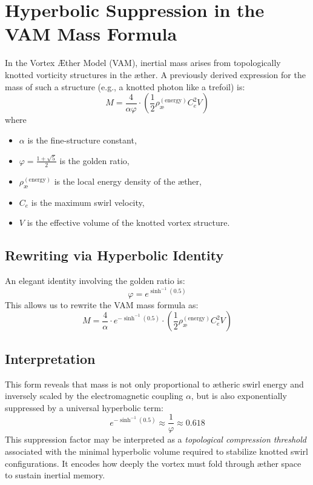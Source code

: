 \section{Hyperbolic Suppression in the VAM Mass Formula}

In the Vortex \AE{}ther Model (VAM), inertial mass arises from topologically knotted vorticity structures in the \ae{}ther. A previously derived expression for the mass of such a structure (e.g., a knotted photon like a trefoil) is:
\begin{equation}
  M = \frac{4}{\alpha \varphi} \cdot \left( \frac{1}{2} \rho_\text{\ae}^{(\text{energy})} C_e^2 V \right)
\end{equation}
where
\begin{itemize}
\item $\alpha$ is the fine-structure constant,
\item $\varphi = \frac{1 + \sqrt{5}}{2}$ is the golden ratio,
\item $\rho_\text{\ae}^{(\text{energy})}$ is the local energy density of the \ae{}ther,
\item $C_e$ is the maximum swirl velocity,
\item $V$ is the effective volume of the knotted vortex structure.
\end{itemize}

\subsection{Rewriting via Hyperbolic Identity}

An elegant identity involving the golden ratio is:
\begin{equation}
  \varphi = e^{\sinh^{-1}(0.5)}
\end{equation}
This allows us to rewrite the VAM mass formula as:
\begin{equation}
\boxed{
M = \frac{4}{\alpha} \cdot e^{-\sinh^{-1}(0.5)} \cdot \left( \frac{1}{2} \rho_\text{\ae}^{(\text{energy})} C_e^2 V \right)
}
\end{equation}

\subsection*{Interpretation}

This form reveals that mass is not only proportional to \ae{}theric swirl energy and inversely scaled by the electromagnetic coupling $\alpha$, but is also exponentially suppressed by a universal hyperbolic term:
\begin{equation}
  e^{-\sinh^{-1}(0.5)} \approx \frac{1}{\varphi} \approx 0.618
\end{equation}
This suppression factor may be interpreted as a \emph{topological compression threshold} associated with the minimal hyperbolic volume required to stabilize knotted swirl configurations. It encodes how deeply the vortex must fold through \ae{}ther space to sustain inertial memory.

